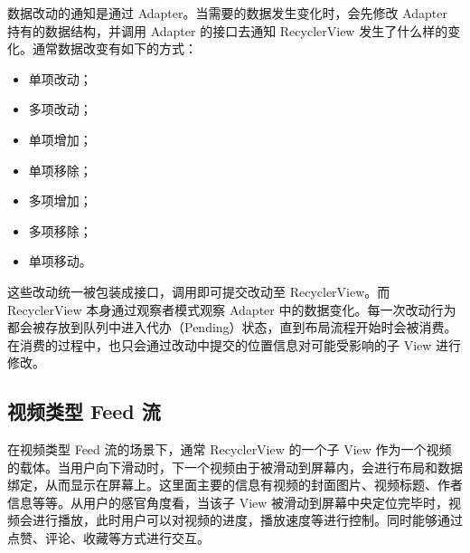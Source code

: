 数据改动的通知是通过 Adapter。当需要的数据发生变化时，会先修改 Adapter 持有的数据结构，并调用 Adapter 的接口去通知 RecyclerView 发生了什么样的变化。通常数据改变有如下的方式：

\begin{itemize}
    \item 单项改动；
    \item 多项改动；
    \item 单项增加；
    \item 单项移除；
    \item 多项增加；
    \item 多项移除；
    \item 单项移动。
\end{itemize}

这些改动统一被包装成接口，调用即可提交改动至 RecyclerView。而 RecyclerView 本身通过观察者模式观察 Adapter 中的数据变化。每一次改动行为都会被存放到队列中进入代办（Pending）状态，直到布局流程开始时会被消费。在消费的过程中，也只会通过改动中提交的位置信息对可能受影响的子 View 进行修改。

\subsection{视频类型 Feed 流}

在视频类型 Feed 流的场景下，通常 RecyclerView 的一个子 View 作为一个视频的载体。当用户向下滑动时，下一个视频由于被滑动到屏幕内，会进行布局和数据绑定，从而显示在屏幕上。这里面主要的信息有视频的封面图片、视频标题、作者信息等等。从用户的感官角度看，当该子 View 被滑动到屏幕中央定位完毕时，视频会进行播放，此时用户可以对视频的进度，播放速度等进行控制。同时能够通过点赞、评论、收藏等方式进行交互。



